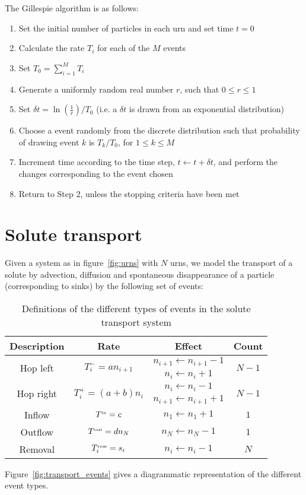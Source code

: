 \documentclass[a4paper,11pt]{article}
\numberwithin{equation}{section}
\newcommand{\Sst}[1]{^\text{\tiny #1}}
\begin{document}
The Gillespie algorithm is as follows:
\begin{enumerate}
    \item Set the initial number of particles in each urn and set time \(t=0\)
    \item Calculate the rate \(T_i\) for each of the \(M\) events
    \item Set \(T_0 = \sum_{i=1}^M T_i\)
    \item Generate a uniformly random real number \(r\), such that \(0 \le r \le 1\)
    \item Set \(\delta t = \ln\left(\frac{1}{r}\right)/T_0\) (i.e. a \(\delta
        t\) is drawn from an exponential distribution)
    \item Choose a event randomly from the discrete distribution such that
        probability of drawing event \(k\) is \(T_k/T_0\), for \(1 \le k \le
        M\)
    \item Increment time according to the time step, \(t \leftarrow t + \delta
        t\), and perform the changes corresponding to the event chosen
    \item Return to Step 2, unless the stopping criteria have been met
\end{enumerate}

\section{Solute transport}
Given a system as in figure~\ref{fig:urns} with \(N\) urns, we model the
transport of a solute by advection, diffusion and spontaneous disappearance of a
particle (corresponding to sinks) by the following set of events:

\begin{table}[ht!]
    \centering
    \begin{tabular}{ c | c | c | c }
        Description & Rate & Effect & Count \\ \hline\hline
        \multirow{2}{*}{Hop left} & \multirow{2}{*}{\(T^-_i = a n_{i+1}\)} &
        \(n_{i+1} \leftarrow n_{i+1} - 1\) & \multirow{2}{*}{\(N-1\)} \\
        & & \(n_i \leftarrow n_i + 1\) \\ \hline
        \multirow{2}{*}{Hop right} & \multirow{2}{*}{\(T^+_i = (a+b) n_i\)} &
        \(n_i \leftarrow n_i - 1\) & \multirow{2}{*}{\(N-1\)} \\
        & & \(n_{i+1} \leftarrow n_{i+1} + 1\) \\ \hline
        Inflow & \(T\Sst{in} = c\) & \(n_1 \leftarrow n_1 + 1\) & \(1\) \\ \hline
        Outflow & \(T\Sst{out} = d n_N\) & \(n_N \leftarrow n_N - 1\) & \(1\) \\ \hline
        Removal & \(T\Sst{rem}_i = s_i\) & \(n_i \leftarrow n_i - 1\) & \(N\) \\
    \end{tabular}
    \caption{\label{tab:transport_events}Definitions of the different types of
events in the solute transport system}
\end{table}
Figure~\ref{fig:transport_events} gives a diagrammatic representation of the
different event types.
\end{document}
